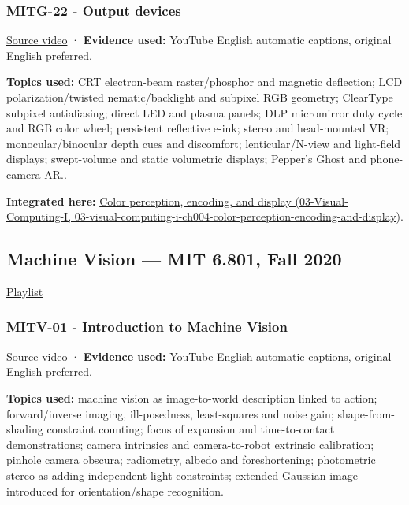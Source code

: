 \subsubsection{MITG-22 - Output devices}\label{04-visual-computing-ii-ch036-mitg-22---output-devices}

\href{https://www.youtube.com/watch?v=Z5693mG_iCE}{Source video} · \textbf{Evidence used:} YouTube English automatic captions, original English preferred.

\textbf{Topics used:} CRT electron-beam raster/phosphor and magnetic deflection; LCD polarization/twisted nematic/backlight and subpixel RGB geometry; ClearType subpixel antialiasing; direct LED and plasma panels; DLP micromirror duty cycle and RGB color wheel; persistent reflective e-ink; stereo and head-mounted VR; monocular/binocular depth cues and discomfort; lenticular/N-view and light-field displays; swept-volume and static volumetric displays; Pepper's Ghost and phone-camera AR..

\textbf{Integrated here:} \href{../03-Visual-Computing-I/main.pdf\#nameddest=03-visual-computing-i-ch004-color-perception-encoding-and-display}{Color perception, encoding, and display (03-Visual-Computing-I, 03-visual-computing-i-ch004-color-perception-encoding-and-display)}.

\subsection{Machine Vision --- MIT 6.801, Fall 2020}\label{04-visual-computing-ii-ch036-machine-vision-mit-6.801-fall-2020}

\href{https://www.youtube.com/playlist?list=PLUl4u3cNGP63pfpS1gV5P9tDxxL_e4W8O}{Playlist}

\subsubsection{MITV-01 - Introduction to Machine Vision}\label{04-visual-computing-ii-ch036-mitv-01---introduction-to-machine-vision}

\href{https://www.youtube.com/watch?v=tY2gczObpfU}{Source video} · \textbf{Evidence used:} YouTube English automatic captions, original English preferred.

\textbf{Topics used:} machine vision as image-to-world description linked to action; forward/inverse imaging, ill-posedness, least-squares and noise gain; shape-from-shading constraint counting; focus of expansion and time-to-contact demonstrations; camera intrinsics and camera-to-robot extrinsic calibration; pinhole camera obscura; radiometry, albedo and foreshortening; photometric stereo as adding independent light constraints; extended Gaussian image introduced for orientation/shape recognition.

